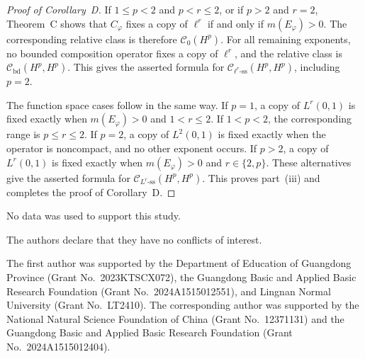 \documentclass[11pt, reqno]{amsart}
\theoremstyle{definition}
\theoremstyle{remark}
\newcommand{\CB}{\mathcal C_{\mathrm{bd}}}
\newcommand{\CSell}[1]{\mathcal C_{\ell^{#1}\text{-ss}}}
\newcommand{\CSL}[1]{\mathcal C_{L^{#1}\text{-ss}}}
\begin{document}
\begin{proof}[Proof of Corollary~D]
If \(1\le p<2\) and \(p<r\le2\), or if \(p>2\) and \(r=2\),
Theorem~C shows that \(C_\varphi\) fixes a copy of \(\ell^r\) if and
only if \(m(E_\varphi)>0\). The corresponding relative class is
therefore \(\mathcal C_0(H^p)\). For all remaining exponents, no
bounded composition operator fixes a copy of \(\ell^r\), and the
relative class is \(\CB(H^p,H^p)\). This gives the asserted formula
for \(\CSell{r}(H^p,H^p)\), including \(p=2\).

The function space cases follow in the same way. If \(p=1\), a copy
of \(L^r(0,1)\) is fixed exactly when \(m(E_\varphi)>0\) and
\(1<r\le2\). If \(1<p<2\), the corresponding range is
\(p\le r\le2\). If \(p=2\), a copy of \(L^2(0,1)\) is fixed exactly
when the operator is noncompact, and no other exponent occurs. If
\(p>2\), a copy of \(L^r(0,1)\) is fixed exactly when
\(m(E_\varphi)>0\) and \(r\in\{2,p\}\). These alternatives give the
asserted formula for \(\CSL{r}(H^p,H^p)\). This proves
part~\textup{(iii)} and completes the proof of Corollary~D.
\end{proof}

  No data was used to support this study.\smallskip
	
  The authors  declare that they have no conflicts of interest.\smallskip

  The first author was supported by the Department of Education of Guangdong
Province (Grant No.~2023KTSCX072), the Guangdong Basic and Applied Basic
Research Foundation (Grant No.~2024A1515012551), and Lingnan Normal
University (Grant No.~LT2410). The corresponding author was supported by the
National Natural Science Foundation of China (Grant No.~12371131) and the Guangdong
Basic and Applied Basic Research Foundation (Grant No.~2024A1515012404).\smallskip
\end{document}
